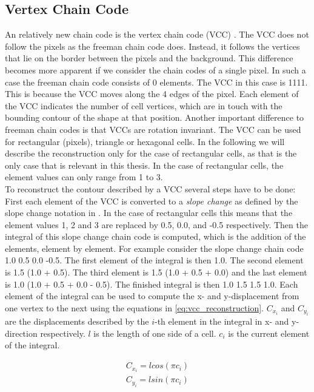 \documentclass[thesis.tex]{subfiles}
\begin{document}
\subsection{Vertex Chain Code}
An relatively new chain code is the vertex chain code (VCC) \cite{vertex_chain_code}. The VCC does not follow the pixels as the freeman chain code does. Instead, it follows the vertices that lie on the border between the pixels and the background. This difference becomes more apparent if we consider the chain codes of a single pixel. In such a case the freeman chain code consists of 0 elements. The VCC in this case is 1111. This is because the VCC moves along the 4 edges of the pixel. Each element of the VCC indicates the number of cell vertices, which are in touch with the bounding contour of the shape at that position. Another important difference to freeman chain codes is that VCCs are rotation invariant. The VCC can be used for rectangular (pixels), triangle or hexagonal cells. In the following we will describe the reconstruction only for the case of rectangular cells, as that is the only case that is relevant in this thesis. In the case of rectangular cells, the element values can only range from 1 to 3. \\ To reconstruct the contour described by a VCC several steps have to be done: First each element of the VCC is converted to a \textit{slope change} as defined by the slope change notation in \cite{slope_change_notation}. In the case of rectangular cells this means that the element values 1, 2 and 3 are replaced by 0.5, 0.0, and -0.5 respectively. Then the integral of this slope change chain code is computed, which is the addition of the elements, element by element. For example consider the slope change chain code 1.0 0.5 0.0 -0.5. The first element of the integral is then 1.0. The second element is 1.5 (1.0 + 0.5). The third element is 1.5 (1.0 + 0.5 + 0.0) and the last element is 1.0 (1.0 + 0.5 + 0.0 - 0.5). The finished integral is then 1.0 1.5 1.5 1.0. Each element of the integral can be used to compute the x- and y-displacement from one vertex to the next using the equations in \ref{eq:vcc_reconstruction}. $C_{x_i}$ and $C_{y_i}$ are the displacements described by the $i$-th element in the integral in x- and y-direction respectively. $l$ is the length of one side of a cell. $c_i$ is the current element of the integral. 

\begin{equation} \label{eq:vcc_reconstruction}
\begin{split} 
C_{x_i} = l  cos(\pi c_i) \\
C_{y_i} = l  sin(\pi c_i) \\
\end{split}
\end{equation}
\end{document}
